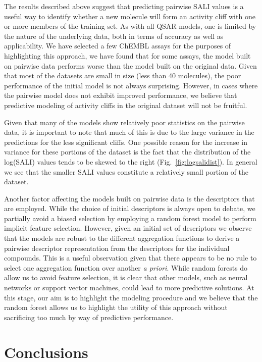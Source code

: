 \documentclass[letterpaper, 12pt]{article}
\begin{document}
The results described above suggest that predicting pairwise SALI values is a useful way to identify
whether a new molecule will form an activity cliff with one or more members of the training set. As
with all QSAR models, one is limited by the nature of the underlying data, both in terms of accuracy
as well as applicability. We have selected a few ChEMBL assays for the purposes of
highlighting this approach, we have found that for some assays, the model built on pairwise data
performs worse than the model built on the original data. Given that most of the datasets are small
in size (less than 40 molecules), the poor performance of the initial model is not always
surprising. However, in cases where the pairwise model does not exhibit improved performance, we
believe that predictive modeling of activity cliffs in the original dataset will not be fruitful.

Given that many of the models show relatively poor statistics on the pairwise data, it is important
to note that much of this is due to the large variance in the predictions for the less significant
cliffs. One possible reason for the increase in variance for these portions of the dataset is the
fact that the distribution of the log(SALI) values tends to be skewed to the right
(Fig.~\ref{fig:logsalidist}). In general we see that the smaller SALI values constitute a relatively
small portion of the dataset.

Another factor affecting the models built on pairwise data is the descriptors that are
employed. While the choice of initial descriptors is always open to debate, we partially avoid a
biased selection by employing a random forest model to perform implicit feature selection. However,
given an initial set of descriptors we observe that the models are robust to the different
aggregation functions to derive a pairwise descriptor representation from the descriptors for the
individual compounds. This is a useful observation given that there appears to be no rule to select
one aggregation function over another \emph{a priori}. While random forests do allow us to avoid
feature selection, it is clear that other models, such as neural networks or support vector
machines, could lead to more predictive solutions. At this stage, our aim is to highlight the
modeling procedure and we believe that the random forest allows us to highlight the utility of this
approach without sacrificing too much by way of predictive performance.

\section{Conclusions}
\label{sec:conclusions}
\end{document}
